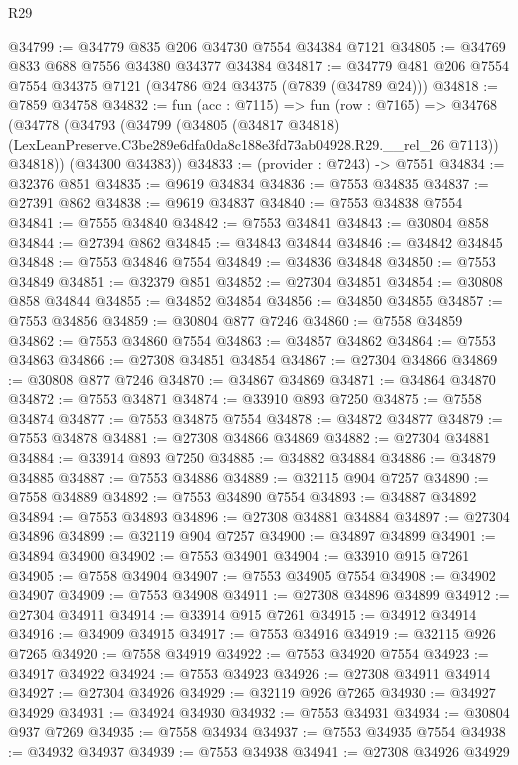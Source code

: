 \begin{lexlean}{R29}
\begin{coremodule}
@34799 := @34779 @835 @206 @34730 @7554 @34384 @7121
@34805 := @34769 @833 @688 @7556 @34380 @34377 @34384
@34817 := @34779 @481 @206 @7554 @7554 @34375 @7121 (@34786 @24 @34375 (@7839 (@34789 @24)))
@34818 := @7859 @34758
@34832 := fun (acc : @7115) =>
  fun (row : @7165) =>
  @34768
    (@34778
      (@34793
        (@34799
          (@34805
            (@34817 @34818)
            (LexLeanPreserve.C3be289e6dfa0da8c188e3fd73ab04928.R29.__rel_26 @7113))
          @34818))
      (@34300 @34383))
@34833 := (provider : @7243) -> @7551
@34834 := @32376 @851
@34835 := @9619 @34834
@34836 := @7553 @34835
@34837 := @27391 @862
@34838 := @9619 @34837
@34840 := @7553 @34838 @7554
@34841 := @7555 @34840
@34842 := @7553 @34841
@34843 := @30804 @858
@34844 := @27394 @862
@34845 := @34843 @34844
@34846 := @34842 @34845
@34848 := @7553 @34846 @7554
@34849 := @34836 @34848
@34850 := @7553 @34849
@34851 := @32379 @851
@34852 := @27304 @34851
@34854 := @30808 @858 @34844
@34855 := @34852 @34854
@34856 := @34850 @34855
@34857 := @7553 @34856
@34859 := @30804 @877 @7246
@34860 := @7558 @34859
@34862 := @7553 @34860 @7554
@34863 := @34857 @34862
@34864 := @7553 @34863
@34866 := @27308 @34851 @34854
@34867 := @27304 @34866
@34869 := @30808 @877 @7246
@34870 := @34867 @34869
@34871 := @34864 @34870
@34872 := @7553 @34871
@34874 := @33910 @893 @7250
@34875 := @7558 @34874
@34877 := @7553 @34875 @7554
@34878 := @34872 @34877
@34879 := @7553 @34878
@34881 := @27308 @34866 @34869
@34882 := @27304 @34881
@34884 := @33914 @893 @7250
@34885 := @34882 @34884
@34886 := @34879 @34885
@34887 := @7553 @34886
@34889 := @32115 @904 @7257
@34890 := @7558 @34889
@34892 := @7553 @34890 @7554
@34893 := @34887 @34892
@34894 := @7553 @34893
@34896 := @27308 @34881 @34884
@34897 := @27304 @34896
@34899 := @32119 @904 @7257
@34900 := @34897 @34899
@34901 := @34894 @34900
@34902 := @7553 @34901
@34904 := @33910 @915 @7261
@34905 := @7558 @34904
@34907 := @7553 @34905 @7554
@34908 := @34902 @34907
@34909 := @7553 @34908
@34911 := @27308 @34896 @34899
@34912 := @27304 @34911
@34914 := @33914 @915 @7261
@34915 := @34912 @34914
@34916 := @34909 @34915
@34917 := @7553 @34916
@34919 := @32115 @926 @7265
@34920 := @7558 @34919
@34922 := @7553 @34920 @7554
@34923 := @34917 @34922
@34924 := @7553 @34923
@34926 := @27308 @34911 @34914
@34927 := @27304 @34926
@34929 := @32119 @926 @7265
@34930 := @34927 @34929
@34931 := @34924 @34930
@34932 := @7553 @34931
@34934 := @30804 @937 @7269
@34935 := @7558 @34934
@34937 := @7553 @34935 @7554
@34938 := @34932 @34937
@34939 := @7553 @34938
@34941 := @27308 @34926 @34929

\end{coremodule}
\end{lexlean}
